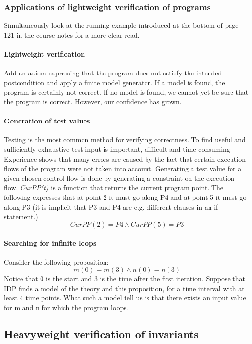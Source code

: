 \documentclass[10pt,a4paper]{article}
\theoremstyle{definition}
\begin{document}
\subsubsection{Applications of lightweight verification of programs}
Simultaneously look at the running example introduced at the bottom of page 121 in the course notes for a more clear read.


\paragraph{Lightweight verification} Add an axiom expressing that the program does not satisfy the intended postcondition and apply a finite model generator. If a model is found, the program is certainly not correct. If no model is found, we cannot yet be sure that the program is correct. However, our confidence has grown.

\paragraph{Generation of test values} Testing is the most common method for verifying correctness. To find useful and sufficiently exhaustive test-input is important, difficult and time consuming. Experience shows that many errors are caused by the fact that certain execution flows of the program were not taken into account. Generating a test value for a given chosen control flow is done by generating a constraint on the execution flow. \textit{CurPP(t)} is a function that returns the current program point. The following expresses that at point 2 it must go along P4 and at point 5 it must go along P3 (it is implicit that P3 and P4 are e.g. different clauses in an if-statement.)  $$CurPP(2) = P4 \land CurPP(5) = P3$$

\paragraph{Searching for infinite loops} Consider the following proposition: $$m(0) = m(3) \land n(0) = n(3)$$ Notice that 0 is the start and 3 is the time after the first iteration. Suppose that IDP finds a model of the theory and this proposition, for a time interval with at least 4 time points. What such a model tell us is that there exists an input value for m and n for which the program loops.


\subsection{Heavyweight verification of invariants}
\end{document}
